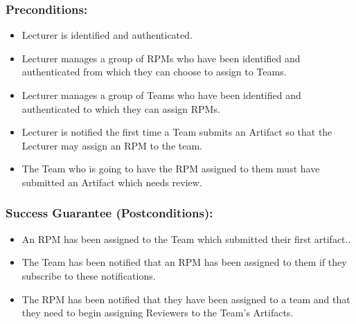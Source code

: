     
    \subsubsection*{\textbf{Preconditions:}}
    \begin{itemize}
    \itemsep-1em 
        \item Lecturer is identified and authenticated. 
        \item Lecturer manages a group of RPMs who have been identified and authenticated from which they can choose to assign to Teams.
         \item Lecturer manages a group of Teams who have been identified and authenticated to which they can assign RPMs.
        \item Lecturer is notified the first time a Team submits an Artifact so that the Lecturer may assign an RPM to the team.
        \item The Team who is going to have the RPM assigned to them must have submitted an Artifact which needs review.
    \end{itemize}


    
    
    
    \subsubsection*{Success Guarantee (Postconditions):}
    \begin{itemize}
    \itemsep-1em 
       \item An RPM has been assigned to the Team which submitted their first artifact..
       \item The Team has been notified that an RPM has been assigned to them if they subscribe to these notifications.
\item The RPM has been notified that they have been assigned to a team and that they need to begin assigning Reviewers to the Team’s Artifacts.
    \end{itemize}
    
    
    
